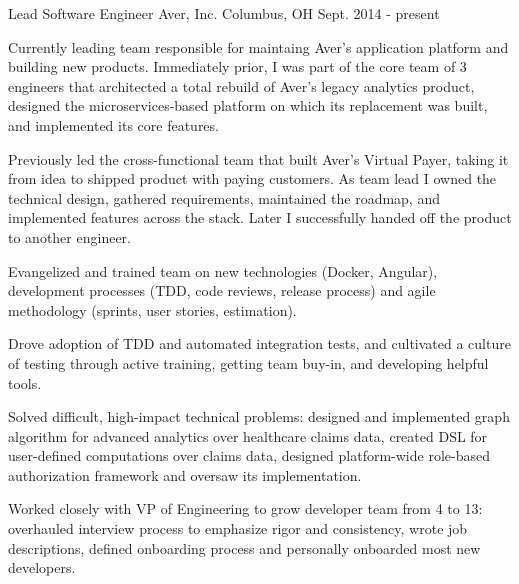 

\begin{cventries}

  \cventry
    {Lead Software Engineer} %
    {Aver, Inc.} %
    {Columbus, OH} %
    {Sept. 2014 - present} %
    {
      \begin{cvitems} %
        \item {Currently leading team responsible for maintaing Aver's application platform and building new products. Immediately prior, I was part of the core team of 3 engineers that architected a total rebuild of Aver's legacy analytics product, designed the microservices-based platform on which its replacement was built, and implemented its core features.}
        \item {Previously led the cross-functional team that built Aver's Virtual Payer, taking it from idea to shipped product with paying customers. As team lead I owned the technical design, gathered requirements, maintained the roadmap, and implemented features across the stack. Later I successfully handed off the product to another engineer.}
        \item {Evangelized and trained team on new technologies (Docker, Angular), development processes (TDD, code reviews, release process) and agile methodology (sprints, user stories, estimation).}
        \item {Drove adoption of TDD and automated integration tests, and cultivated a culture of testing through active training, getting team buy-in, and developing helpful tools. }
        \item {Solved difficult, high-impact technical problems: designed and implemented graph algorithm for advanced analytics over healthcare claims data, created DSL for user-defined computations over claims data, designed platform-wide role-based authorization framework and oversaw its implementation.}
        \item {Worked closely with VP of Engineering to grow developer team from 4 to 13: overhauled interview process to emphasize rigor and consistency, wrote job descriptions, defined onboarding process and personally onboarded most new developers.}
      \end{cvitems}
    }


\end{cventries}
